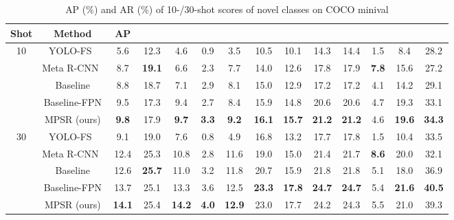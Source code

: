 \documentclass[runningheads]{llncs}
\begin{document}
\begin{table}
\begin{center}
\caption{AP (\%) and AR (\%) of 10-/30-shot scores of novel classes on COCO minival}
\label{table:cocotable}
\begin{tabular}{c|c|ccc|ccc|ccc|ccc}
	\hline
	Shot                & Method       & AP            &           &           &           &            &            &            &           &          &           &            &            \\ \hline
	\multirow{5}{*}{10} & YOLO-FS~\cite{yolore}      & 5.6           & 12.3          & 4.6           & 0.9          & 3.5           & 10.5          & 10.1          & 14.3          & 14.4          & 1.5          & 8.4           & 28.2          \\
	& Meta R-CNN~\cite{metarcnn}   & 8.7           & \textbf{19.1} & 6.6           & 2.3          & 7.7           & 14.0          & 12.6          & 17.8          & 17.9          & \textbf{7.8} & 15.6          & 27.2          \\
	& Baseline     & 8.8           & 18.7          & 7.1           & 2.9          & 8.1           & 15.0          & 12.9          & 17.2          & 17.2          & 4.1          & 14.2          & 29.1          \\
	& Baseline-FPN & 9.5           & 17.3          & 9.4           & 2.7          & 8.4           & 15.9          & 14.8          & 20.6          & 20.6          & 4.7          & 19.3          & 33.1          \\
	& MPSR (ours)  & \textbf{9.8}  & 17.9          & \textbf{9.7}  & \textbf{3.3} & \textbf{9.2}  & \textbf{16.1} & \textbf{15.7} & \textbf{21.2} & \textbf{21.2} & 4.6          & \textbf{19.6} & \textbf{34.3} \\ \hline
	\multirow{5}{*}{30} & YOLO-FS~\cite{yolore}      & 9.1           & 19.0          & 7.6           & 0.8          & 4.9           & 16.8          & 13.2          & 17.7          & 17.8          & 1.5          & 10.4          & 33.5          \\
	& Meta R-CNN~\cite{metarcnn}   & 12.4          & 25.3          & 10.8          & 2.8          & 11.6          & 19.0          & 15.0          & 21.4          & 21.7          & \textbf{8.6} & 20.0          & 32.1          \\
	& Baseline     & 12.6          & \textbf{25.7} & 11.0          & 3.2          & 11.8          & 20.7          & 15.9          & 21.8          & 21.8          & 5.1          & 18.0          & 36.9          \\
	& Baseline-FPN & 13.7          & 25.1          & 13.3          & 3.6          & 12.5          & \textbf{23.3} & \textbf{17.8} & \textbf{24.7} & \textbf{24.7} & 5.4          & \textbf{21.6} & \textbf{40.5} \\
	& MPSR (ours)  & \textbf{14.1} & 25.4          & \textbf{14.2} & \textbf{4.0} & \textbf{12.9} & 23.0          & 17.7          & 24.2          & 24.3          & 5.5          & 21.0          & 39.3          \\ \hline
\end{tabular}
\end{center}
\end{table}
\setlength{\tabcolsep}{1.4pt}
\end{document}
